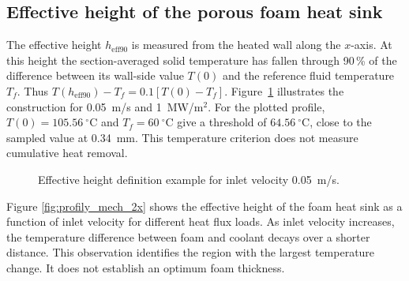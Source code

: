 \documentclass[a4paper]{article}
\begin{document}
\subsection{Effective height of the porous foam heat sink}

The effective height $h_{\mathrm{eff90}}$ is measured from the heated wall along the $x$-axis. At this height the section-averaged solid temperature has fallen through 90\,\% of the difference between its wall-side value $T(0)$ and the reference fluid temperature $T_f$. Thus $T(h_{\mathrm{eff90}})-T_f=0.1[T(0)-T_f]$. Figure~\ref{fig:profily_mech_1x} illustrates the construction for 0.05~m/s and 1~MW/m$^2$. For the plotted profile, $T(0)=105.56~^\circ\mathrm{C}$ and $T_f=60~^\circ\mathrm{C}$ give a threshold of $64.56~^\circ\mathrm{C}$, close to the sampled value at 0.34~mm. This temperature criterion does not measure cumulative heat removal.

\begin{figure}[H]
\centering
{}
\caption{Effective height definition example for inlet velocity 0.05~m/s.}
\label{fig:profily_mech_1x}
\end{figure}

Figure \ref{fig:profily_mech_2x} shows the effective height of the foam heat sink as a function of inlet velocity for different heat flux loads.
As inlet velocity increases, the temperature difference between foam and coolant decays over a shorter distance. This observation identifies the region with the largest temperature change. It does not establish an optimum foam thickness.
\end{document}
